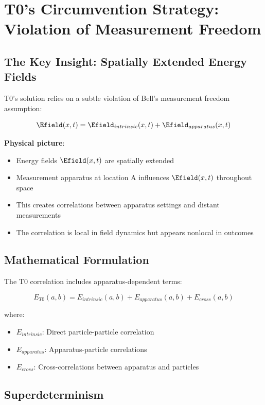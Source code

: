 	\section{T0's Circumvention Strategy: Violation of Measurement Freedom}
	
	\subsection{The Key Insight: Spatially Extended Energy Fields}
	
	T0's solution relies on a subtle violation of Bell's measurement freedom assumption:
	
	\begin{equation}
		\Efield(x,t) = \Efield_{intrinsic}(x,t) + \Efield_{apparatus}(x,t)
	\end{equation}
	
	\textbf{Physical picture}:
	\begin{itemize}
		\item Energy fields $\Efield(x,t)$ are spatially extended
		\item Measurement apparatus at location A influences $\Efield(x,t)$ throughout space
		\item This creates correlations between apparatus settings and distant measurements
		\item The correlation is local in field dynamics but appears nonlocal in outcomes
	\end{itemize}
	
	\subsection{Mathematical Formulation}
	
	The T0 correlation includes apparatus-dependent terms:
	
	\begin{equation}
		E_{T0}(a,b) = E_{intrinsic}(a,b) + E_{apparatus}(a,b) + E_{cross}(a,b)
	\end{equation}
	
	where:
	\begin{itemize}
		\item $E_{intrinsic}$: Direct particle-particle correlation
		\item $E_{apparatus}$: Apparatus-particle correlations
		\item $E_{cross}$: Cross-correlations between apparatus and particles
	\end{itemize}
	
	\subsection{Superdeterminism}
	

